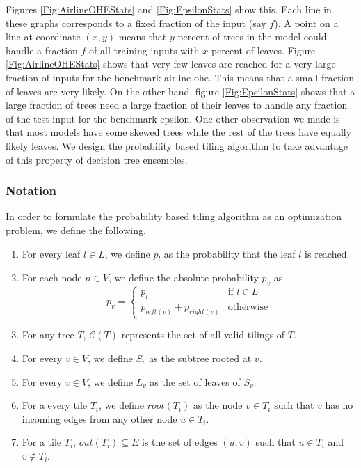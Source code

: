 Figures \ref{Fig:AirlineOHEStats} and \ref{Fig:EpsilonStats} show this. Each line in these graphs corresponds to a fixed fraction of the input (say $f$). 
A point on a line at coordinate $(x, y)$ means that $y$ percent of trees in the model could handle a fraction $f$ of all training inputs with $x$ percent of 
leaves. 
Figure \ref{Fig:AirlineOHEStats} shows that very few leaves are reached for a very large fraction of inputs for the benchmark airline-ohe. 
This means that a small fraction of leaves are very likely. On the other hand,
figure \ref{Fig:EpsilonStats} shows that a large fraction of trees need a large fraction of their leaves to handle any fraction of the test input 
for the benchmark epsilon. One other observation we made is that most models have some skewed trees while the rest of the trees have equally likely leaves.
 We design the probability based tiling algorithm to take advantage of this property 
of decision tree ensembles. 

\subsubsection{Notation}
In order to formulate the probability based tiling algorithm as an optimization problem, we define the following.
\begin{enumerate}
    \item For every leaf $l \in L$, we define $p_l$ as the probability that the leaf $l$ is reached.
    \item For each node $n \in V$, we define the absolute probability $p_v$ as
    \begin{equation}
        p_v = \begin{cases}
        p_l &\text{if $l \in L$}\\
        p_{left(v)} + p_{right(v)} &\text{otherwise}
        \end{cases}
    \end{equation}
    \item For any tree $T$, $\mathcal{C}(T)$ represents the set of all valid tilings of $T$.
    \item For every $v \in V$, we define $S_v$ as the subtree rooted at $v$.
    \item For every $v \in V$, we define $L_v$ as the set of leaves of $S_v$.
    \item For a every tile $T_i$, we define $root(T_i)$ as the node $v \in T_i$ such that $v$ has no incoming edges from any other node $u \in T_i$.
    \item For a tile $T_i$, $out(T_i) \subseteq E$ is the set of edges $(u, v)$ such that $u \in T_i$ and $v \notin T_i$.
\end{enumerate}

